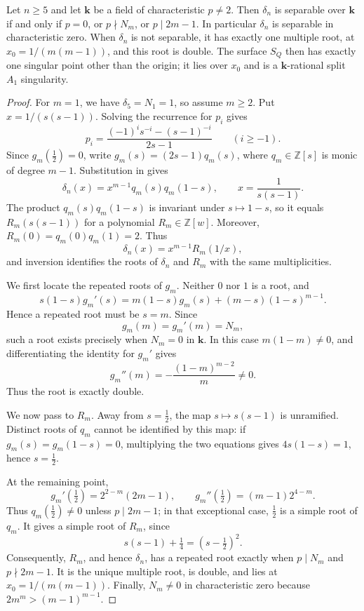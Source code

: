 \documentclass[a4paper]{amsart}
\newcommand{\kk}{\mathbf{k}}
\newcommand{\ZZ}{\mathbb{Z}}
\numberwithin{equation}{section}
\begin{document}
\begin{proposition}\label{prop:hn-separable}
Let $n\ge5$ and let $\kk$ be a field of characteristic $p\ne2$. Then
$\delta_n$ is separable over $\kk$ if and only if $p=0$, or $p\nmid N_m$, or
$p\mid 2m-1$. In particular $\delta_n$ is separable in characteristic zero.
When $\delta_n$ is not separable, it has exactly one multiple root,
at $x_0=1/(m(m-1))$, and this root is double. The surface $S_Q$ then
has exactly one singular point other than the origin; it lies over
$x_0$ and is a $\kk$-rational split $A_1$ singularity.
\end{proposition}

\begin{proof}
For $m=1$, we have $\delta_5=N_1=1$, so assume $m\ge2$.
Put $x=1/(s(s-1))$. Solving the recurrence for $p_i$ gives
\[
 p_i=\frac{(-1)^is^{-i}-(s-1)^{-i}}{2s-1}\qquad(i\ge-1).
\]
Since $g_m(\tfrac12)=0$, write $g_m(s)=(2s-1)q_m(s)$, where
$q_m\in\ZZ[s]$ is monic of degree $m-1$. Substitution in
 gives
\begin{equation}\label{eq:hn-closed-form}
 \delta_n(x)=x^{m-1}q_m(s)q_m(1-s),\qquad x=\frac1{s(s-1)}.
\end{equation}
The product $q_m(s)q_m(1-s)$ is invariant under $s\mapsto1-s$,
so it equals $R_m(s(s-1))$ for a polynomial $R_m\in\ZZ[w]$.
Moreover, $R_m(0)=q_m(0)q_m(1)=2$. Thus
\[
 \delta_n(x)=x^{m-1}R_m(1/x),
\]
and inversion identifies the roots of $\delta_n$ and $R_m$
with the same multiplicities.

We first locate the repeated roots of $g_m$. Neither $0$ nor $1$
is a root, and
\[
 s(1-s)g_m'(s)=m(1-s)g_m(s)+(m-s)(1-s)^{m-1}.
\]
Hence a repeated root must be $s=m$. Since
\[
 g_m(m)=g_m'(m)=N_m,
\]
such a root exists precisely when $N_m=0$ in $\kk$. In this case
$m(1-m)\ne0$, and differentiating the identity for $g_m'$ gives
\[
 g_m''(m)=-\frac{(1-m)^{m-2}}m\ne0.
\]
Thus the root is exactly double.

We now pass to $R_m$. Away from $s=\tfrac12$, the map
$s\mapsto s(s-1)$ is unramified. Distinct roots of $q_m$ cannot
be identified by this map: if $g_m(s)=g_m(1-s)=0$, multiplying
the two equations gives $4s(1-s)=1$, hence $s=\tfrac12$.

At the remaining point,
\[
 g_m'(\tfrac12)=2^{2-m}(2m-1),\qquad
 g_m''(\tfrac12)=(m-1)2^{4-m}.
\]
Thus $q_m(\tfrac12)\ne0$ unless $p\mid2m-1$; in that exceptional
case, $\tfrac12$ is a simple root of $q_m$. It gives a simple
root of $R_m$, since
\[
 s(s-1)+\tfrac14=(s-\tfrac12)^2.
\]
Consequently, $R_m$, and hence $\delta_n$, has a repeated root
exactly when $p\mid N_m$ and $p\nmid2m-1$. It is the unique multiple
root, is double, and lies at $x_0=1/(m(m-1))$.
Finally, $N_m\ne0$ in characteristic zero
because $2m^m>(m-1)^{m-1}$.


\end{proof}
\end{document}
